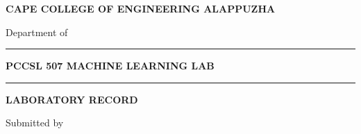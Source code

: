 \documentclass[11pt,twoside]{article}
\begin{document}
\sloppy

\begin{center}
\vspace*{38pt}
{\fontsize{15}{18}\selectfont\textcolor{primary}{\textbf{CAPE COLLEGE OF ENGINEERING ALAPPUZHA}}}\par
\vspace{10pt}
{\fontsize{11}{14}\selectfont\textcolor{greytext}{Department of \underline{\hspace{4.5cm}}}}\par
\vspace{28pt}
{\color{primary}\rule{\textwidth}{0.75pt}}\par
\vspace{6pt}
{\fontsize{20}{24}\selectfont\textcolor{primary}{\textbf{PCCSL 507 MACHINE LEARNING LAB}}}\par
\vspace{6pt}
{\color{primary}\rule{\textwidth}{0.75pt}}\par
\vspace{10pt}
{\fontsize{15}{18}\selectfont\textbf{LABORATORY RECORD}}\par
\vspace{28pt}
{\fontsize{11}{14}\selectfont Submitted by}\par
\vspace{8pt}
\end{center}
\end{document}

